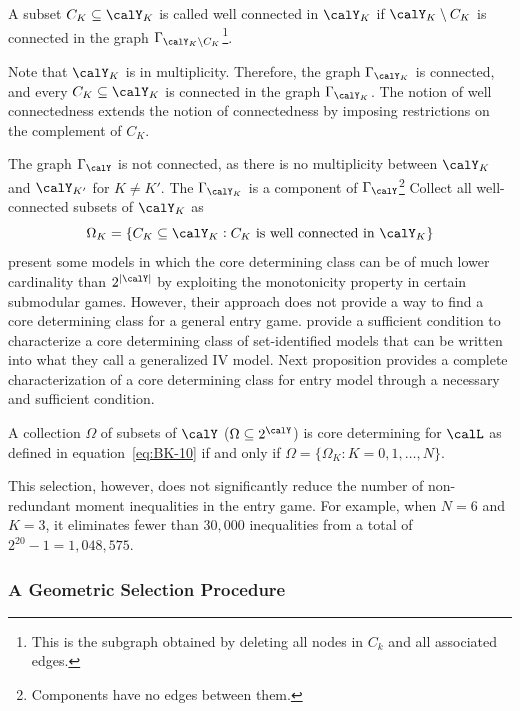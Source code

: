 \begin{definition}
	\label{def:BK-4}
	A subset $C_K \subseteq \calY_K$ is called well connected in $\calY_K$ if $\calY_K \setminus C_K$ is connected in the graph $\Gamma_{\calY_K\setminus C_K}$\footnote{This is the subgraph obtained by deleting all nodes in $C_k$ and all associated edges.}.
\end{definition}

Note that $\calY_K$ is in multiplicity. Therefore, the graph $\Gamma_{\calY_K}$ is connected, and every $C_K \subseteq \calY_K$ is connected in the graph $\Gamma_{\calY_K}$. The notion of well connectedness extends the notion of connectedness by imposing restrictions on the complement of $C_K$. 

The graph $\Gamma_\calY$ is not connected, as there is no multiplicity between $\calY_K$ and $\calY_{K'}$ for $K\neq K'$. The $\Gamma_{\calY_K}$ is a component of $\Gamma_\calY$\footnote{Components have no edges between them.} Collect all well-connected subsets of $\calY_K$ as 
\[\Omega_K = \{C_K \subseteq \calY_K : C_K\text{ is well connected in }\calY_K\}\]
\citet{GH-2011} present some models in which the core determining class can be of much lower cardinality than $2^{|\calY|}$ by exploiting the monotonicity property in certain submodular games. However, their approach does not provide a way to find a core determining class for a general entry game. \citet{CR-2017} provide a sufficient condition to characterize a core determining class of set-identified models that can be written into what they call a generalized IV model. Next proposition provides a complete characterization of a core determining class for entry model through a necessary and sufficient condition.
\begin{prop}
	\label{prop:BK-7}
	A collection $\Omega$ of subsets of $\calY$ ($\Omega \subseteq 2^\calY$) is core determining for $\calL$ as defined in equation~\eqref{eq:BK-10} if and only if $\Omega = \{\Omega_K: K = 0, 1, \dots, N\}$.
\end{prop}

This selection, however, does not significantly reduce the number of non-redundant moment inequalities in the entry game. For example, when $N = 6$ and $K = 3$, it eliminates fewer than $30,000$ inequalities from a total of $2^{20} - 1 = 1,048,575$. 

\subsubsection{A Geometric Selection Procedure}


